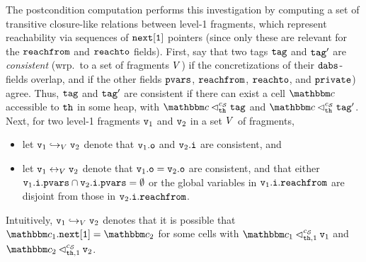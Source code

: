 The postcondition computation performs this investigation
by computing a set of transitive closure-like relations
between level-1 fragments, which represent reachability
via sequences of $\tt next[1]$ pointers (since only these are relevant for the
$\mathtt{reachfrom}$ and $\mathtt{reachto}$ fields).
First, say that two tags
$\mathtt{tag}$ and $\mathtt{tag}'$ are {\em consistent}
(wrp.\ to a set of fragments $V$) if the concretizations of their
$\mathtt{dabs}$-fields overlap, and if the other fields
$\mathtt{pvars}$, $\mathtt{reachfrom}$, $\mathtt{reachto}$, and $\mathtt{private}$) agree.
Thus, $\mathtt{tag}$ and $\mathtt{tag}'$ are consistent if there can exist a cell
$\cell$ accessible to ${\tt th}$ in some heap,
with $\cell \satfrag{\thread}{\sconf} \atag$
and $\cell \satfrag{\thread}{\sconf} \atag'$.
Next, for two level-1 fragments $\mathtt{v}_1$ and $\mathtt{v}_2$ in a
set $V$ of fragments,
\begin{itemize}
\item let $\mathtt{v}_1 \hookrightarrow_{V} \mathtt{v}_2$ denote that $\mathtt{v}_1.\mathtt{o}$   and $\mathtt{v}_2.\mathtt{i}$ are consistent, and
\item let $\mathtt{v}_1 \leftrightarrow_{V} \mathtt{v}_2$ denote that $\mathtt{v}_1.\mathtt{o} = \mathtt{v}_2.\mathtt{o}$ are consistent, and that either
  $\mathtt{v}_1.\mathtt{i}.\mathtt{pvars} \cap \mathtt{v}_2.\mathtt{i}.\mathtt{pvars} = \emptyset$ or
  the global variables in  $\mathtt{v}_1.\mathtt{i}.\mathtt{reachfrom}$ are disjoint from
  those in $\mathtt{v}_2.\mathtt{i}.\mathtt{reachfrom}$.

\end{itemize}
Intuitively, $\mathtt{v}_1 \hookrightarrow_{V} \mathtt{v}_2$ denotes that it is
possible that  $\cell_1.{\tt next[1]} = \cell_2$ for some cells with
  $\cell_1 \lsatfrag{1}{{\thread}}{\sconf} \frag_1$ and
  $\cell_2 \lsatfrag{1}{{\thread}}{\sconf} \frag_2$.
